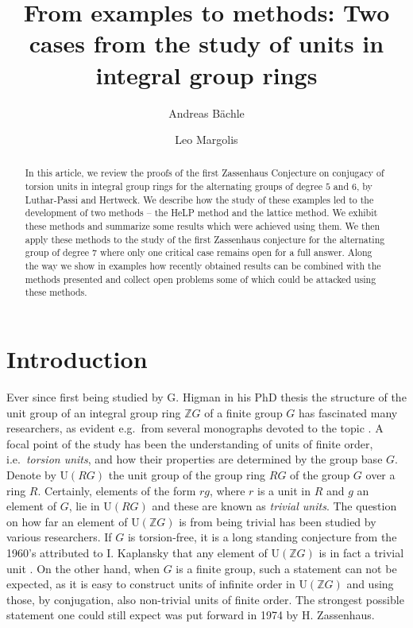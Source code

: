 \documentclass[10pt,a4paper,reqno]{amsart}
\title{From examples to methods: Two cases from the study of units in integral group rings}
\author{Andreas B\"achle}
\author{Leo Margolis}
\theoremstyle{definition}
\theoremstyle{remark}
\newcommand{\U}{\mathrm{U}}
\newcommand{\ZZ}{\mathbb{Z}}
\begin{document}
\maketitle

\begin{abstract} In this article, we review the proofs of the first Zassenhaus Conjecture on conjugacy of torsion units in integral group rings for the alternating groups of degree $5$ and $6$, by Luthar-Passi and Hertweck. We describe how the study of these examples led to the development of two methods -- the HeLP method and the lattice method. We exhibit these methods and summarize some results which were achieved using them. We then apply these methods to the study of the first Zassenhaus conjecture for the alternating group of degree $7$ where only one critical case remains open for a full answer. Along the way we show in examples how recently obtained results can be combined with the methods presented and collect open problems some of which could be attacked using these methods.
\end{abstract}

\section{Introduction}
Ever since first being studied by G. Higman in his PhD thesis \cite{Hig40, San81} the structure of the unit group of an integral group ring $\ZZ G$ of a finite group $G$ has fascinated many researchers, as evident e.g.\ from several monographs devoted to the topic \cite{Seh78, Bov87, Seh93, PMS02, JdR16a, JdR16b}. A focal point of the study has been the understanding of units of finite order, i.e.\ \emph{torsion units}, and how their properties are determined by the group base $G$. Denote by $\U(RG)$ the unit group of the group ring $RG$ of the group $G$ over a ring $R$. Certainly, elements of the form $rg$, where $r$ is a unit in $R$ and $g$ an element of $G$, lie in $\U(RG)$ and these are known as \emph{trivial units}. The question on how far an element of $\U(\ZZ G)$ is from being trivial has been studied by various researchers. If $G$ is torsion-free, it is a long standing conjecture from the 1960's attributed to I. Kaplansky that any element of $\U(\ZZ G)$ is in fact a trivial unit \cite[Question 1.135]{Dni69}. On the other hand, when $G$ is a finite group, such a statement can not be expected, as it is easy to construct units of infinite order in $\U(\ZZ G)$ \cite[Chapter 1]{JdR16a} and using those, by conjugation, also non-trivial units of finite order. The strongest possible statement one could still expect was put forward in 1974 by H. Zassenhaus.\\
\end{document}

